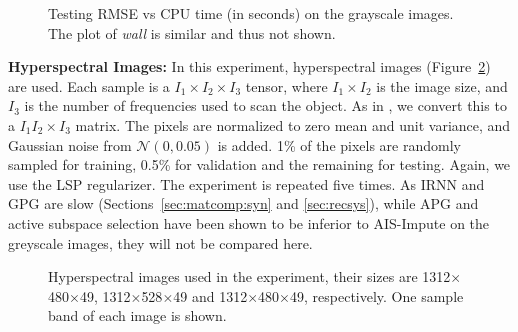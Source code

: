 \documentclass[10pt,journal,compsoc]{IEEEtran}
\begin{document}
\begin{figure}[ht]
	\centering
	
	\vspace{-10px}
	\caption{Testing RMSE vs CPU time (in seconds) on the grayscale images.
	The plot of \textit{wall} is similar and thus not shown.}
	\label{fig:rmse:image}
\end{figure}


\noindent
\textbf{Hyperspectral Images:}
In this experiment,
hyperspectral images
(Figure~\ref{fig:hyper}) are used.
Each sample
is a 
$I_1 \times I_2 \times I_3$
tensor, where
$I_1\times I_2$ is the image size,
and $I_3$ is the number of frequencies
used to scan the object.
As in \cite{signoretto2011tensor},
we convert
this to a
$I_1 I_2 \times I_3$
matrix.
The pixels 
are normalized
to zero mean and unit variance,
and Gaussian noise from $\mathcal{N}(0, 0.05)$ is added.
1\% of the pixels are 
randomly sampled 
for training,
0.5\% for validation and 
the remaining
for testing. 
Again, we use the LSP regularizer.
The experiment is repeated five times.
As \textsf{IRNN} and \textsf{GPG} are slow (Sections~\ref{sec:matcomp:syn} and \ref{sec:recsys}), 
while \textsf{APG} and active subspace selection 
have been shown 
to be inferior to
\textsf{AIS-Impute} on the greyscale images, 
they will not be compared here.

\begin{figure}[ht]
\centering
\quad
{}
\quad
{}

\vspace{-10px} 
\caption{Hyperspectral images used in the experiment, 
their sizes are 1312$\times$480$\times$49, 1312$\times$528$\times$49 and 1312$\times$480$\times$49, respectively.
One sample band of each image is shown.}
\label{fig:hyper}
\end{figure}
\end{document}
